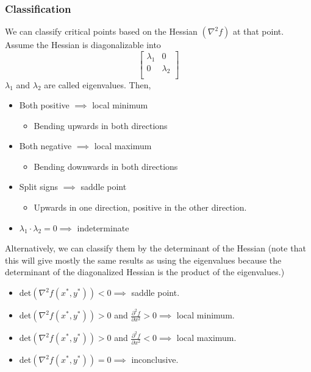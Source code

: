 \documentclass[12pt]{article}
\theoremstyle{plain} %
\theoremstyle{definition}
\theoremstyle{definition}
\theoremstyle{definition}
\theoremstyle{remark}
\begin{document}
\subsubsection{Classification}
We can classify critical points based on the Hessian $(\nabla^2 f)$ at that point. Assume the Hessian is diagonalizable into
\[ \begin{bmatrix}
    \lambda_1 & 0 \\
    0 & \lambda_2 \\
\end{bmatrix} \]
$\lambda_1$ and $\lambda_2$ are called eigenvalues. Then,
\begin{itemize}
    \item Both positive $\implies$ local minimum
    \begin{itemize}
        \item Bending upwards in both directions
    \end{itemize}
    \item Both negative $\implies$ local maximum
    \begin{itemize}
        \item Bending downwards in both directions
    \end{itemize}
    \item Split signs $\implies$ saddle point
    \begin{itemize}
        \item Upwards in one direction, positive in the other direction.
    \end{itemize}
    \item $\lambda_1 \cdot \lambda_2 = 0 \implies$ indeterminate
\end{itemize}
Alternatively, we can classify them by the determinant of the Hessian (note that this will give mostly the same results as using the eigenvalues because the determinant of the diagonalized Hessian is the product of the eigenvalues.)
\begin{itemize}
    \item det$\left( \nabla^2 f(x^*,y^*)\right)<0 \implies$ saddle point.
    \item det$\left( \nabla^2 f(x^*,y^*)\right)>0$ and $\frac{\partial^2 f}{\partial x^2}>0 \implies$ local minimum.
    \item det$\left( \nabla^2 f(x^*,y^*)\right)>0$ and $\frac{\partial^2 f}{\partial x^2}<0 \implies$ local maximum.
    \item det$\left( \nabla^2 f(x^*,y^*)\right)=0 \implies$ inconclusive.
\end{itemize}
\end{document}
